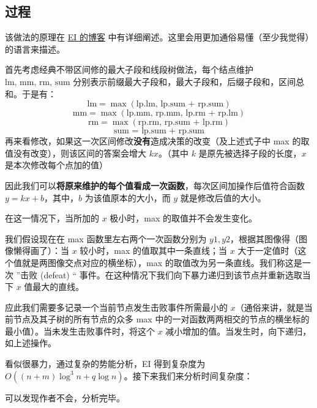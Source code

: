 \documentclass[11pt,oneside,a4paper,UTF8]{book}
\begin{document}
	\subsection{过程}
	该做法的原理在 \href{https://blog.csdn.net/EI_Captain/article/details/101040226}{EI 的博客} 中有详细阐述。这里会用更加通俗易懂（至少我觉得）的语言来描述。\par
	首先考虑经典不带区间修的最大子段和线段树做法，每个结点维护 $\text{lm, mm, rm, sum}$ 分别表示前缀最大子段和，最大子段和，后缀子段和，区间总和。于是有：
	$$\text{lm} = \max(\text{lp.lm, lp.sum + rp.sum})$$
	$$\text{mm} = \max(\text{lp.mm, rp.mm, lp.rm + rp.lm})$$
	$$\text{rm} = \max(\text{rp.rm, rp.sum + lp.rm})$$
	$$\text{sum = lp.sum + rp.sum}$$
	再来看修改，如果这一次区间修改\textbf{没有}造成决策的改变（及上述式子中 max 的取值没有改变），则该区间的答案会增大 $kx$。（其中 $k$ 是原先被选择子段的长度，$x$ 是本次修改每个点加的值）\par
	因此我们可以\textbf{将原来维护的每个值看成一次函数}，每次区间加操作后值符合函数 $y=kx+b$，其中，$b$ 为该值原本的大小，而 $y$ 就是修改后值的大小。\par
	在这一情况下，当所加的 $x$ 极小时，max 的取值并不会发生变化。\par
	我们假设现在在 max 函数里左右两个一次函数分别为 $y1, y2$，根据其图像得（图像懒得画了）：当 $x$ 较小时，max 的值取其中一条直线；当 $x$ 大于一定值时（这个值就是两图像交点对应的横坐标），max 的取值改为另一条直线。我们称这是一次 ”击败 (defeat) “ 事件。在这种情况下我们向下暴力递归到该节点并重新选取当下 $x$ 值最大的直线。\par
	应此我们需要多记录一个当前节点发生击败事件所需最小的 $x$（通俗来讲，就是当前节点及其子树的所有节点的众多 max 中的一对函数两两相交的节点的横坐标的最小值）。当未发生击败事件时，将这个 $x$ 减小增加的值。当发生时，向下递归，如上述操作。\par 
	看似很暴力，通过复杂的势能分析，EI 得到复杂度为 $O((n+m)\log^3n+q\log n)$。接下来我们来分析时间复杂度：\par
	可以发现作者不会，分析完毕。\par
\end{document}

